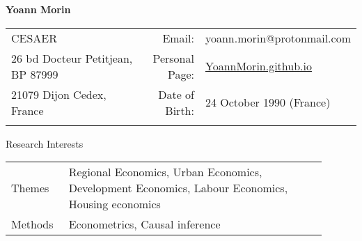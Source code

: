 \documentclass{resume} %
\date{}
\begin{document}
\begin{center}
{\LARGE \textbf{Yoann Morin}}
\end{center}
\vspace*{5mm}
\begin{table}[h]
{\def\arraystretch{1.2}\tabcolsep=0pt
\begin{tabular}{p{0.60\linewidth}p{0.05\linewidth}p{0.35\linewidth}}
  
  CESAER & \multicolumn{1}{r}{Email:\;\;} & \multicolumn{1}{l}{yoann.morin@protonmail.com} \\
  
  26 bd Docteur Petitjean, BP 87999 & \multicolumn{1}{r}{Personal Page:\;\;} &\multicolumn{1}{l}{\href{http://YoannMorin.github.io}{YoannMorin.github.io}} \\
  
  21079 Dijon Cedex, France& \multicolumn{1}{r}{Date of Birth:\;\;} & \multicolumn{1}{l}{{24 October 1990 (France)}} \\
  
  & \multicolumn{1}{r}{ } & \multicolumn{1}{l}{ } \\

\end{tabular}%
}
\end{table}
\begin{rSection}{Research Interests}
\begin{table}[H]
{\def\arraystretch{1.5}\tabcolsep=0pt
\begin{tabular}{p{0.15\linewidth}p{0.75\linewidth}}
Themes &  Regional Economics, Urban Economics, Development Economics, Labour Economics, Housing economics \\
Methods &  Econometrics, Causal inference \\
\end{tabular}%
}
\end{table}
\end{rSection}
\vspace*{-7mm}
\end{document}
